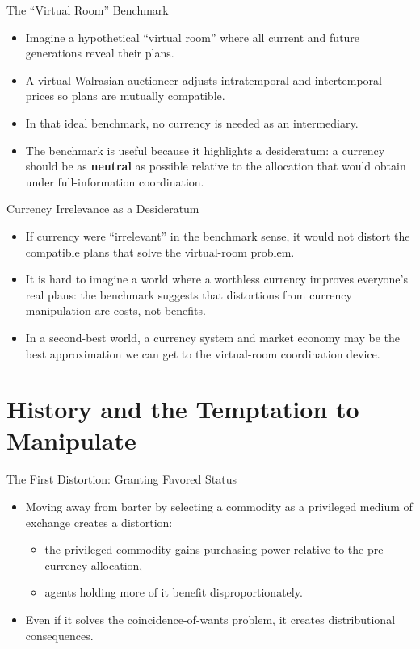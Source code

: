 \documentclass[11pt,aspectratio=169]{beamer}
\begin{document}
\begin{frame}{The ``Virtual Room'' Benchmark}
\small
\begin{itemize}
  \item Imagine a hypothetical ``virtual room'' where all current and future generations reveal their plans.
  \item A virtual Walrasian auctioneer adjusts intratemporal and intertemporal prices so plans are mutually compatible.
  \item In that ideal benchmark, no currency is needed as an intermediary.
  \item The benchmark is useful because it highlights a desideratum:
  a currency should be as \textbf{neutral} as possible relative to the allocation that would obtain under full-information coordination.
\end{itemize}
\end{frame}

\begin{frame}{Currency Irrelevance as a Desideratum}
\small
\begin{itemize}
  \item If currency were ``irrelevant'' in the benchmark sense, it would not distort the compatible plans that solve the virtual-room problem.
  \item It is hard to imagine a world where a worthless currency improves everyone’s real plans:
  the benchmark suggests that distortions from currency manipulation are costs, not benefits.
  \item In a second-best world, a currency system and market economy may be the best approximation we can get to the virtual-room coordination device.
\end{itemize}
\end{frame}

\section{History and the Temptation to Manipulate}

\begin{frame}{The First Distortion: Granting Favored Status}
\small
\begin{itemize}
  \item Moving away from barter by selecting a commodity as a privileged medium of exchange creates a distortion:
  \begin{itemize}
    \item the privileged commodity gains purchasing power relative to the pre-currency allocation,
    \item agents holding more of it benefit disproportionately.
  \end{itemize}
  \item Even if it solves the coincidence-of-wants problem, it creates distributional consequences.
\end{itemize}
\end{frame}
\end{document}
